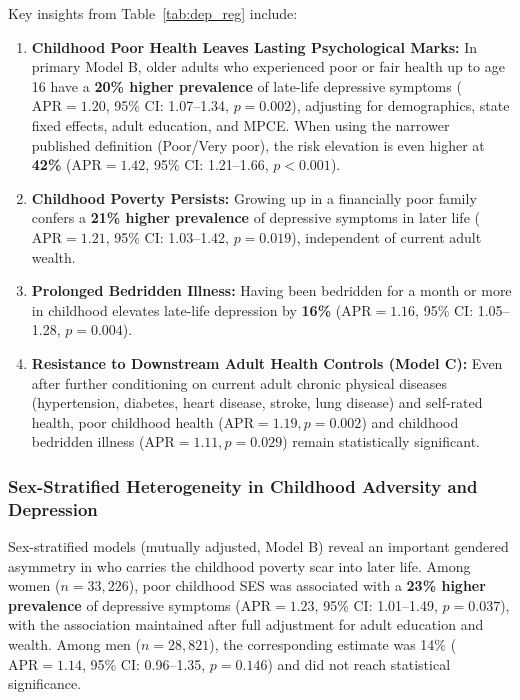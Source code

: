 Key insights from Table~\ref{tab:dep_reg} include:
\begin{enumerate}
    \item \textbf{Childhood Poor Health Leaves Lasting Psychological Marks:} In primary Model B, older adults who experienced poor or fair health up to age 16 have a \textbf{20\% higher prevalence} of late-life depressive symptoms ($\text{APR} = 1.20$, 95\% CI: 1.07--1.34, $p = 0.002$), adjusting for demographics, state fixed effects, adult education, and MPCE. When using the narrower published definition (Poor/Very poor), the risk elevation is even higher at \textbf{42\%} ($\text{APR} = 1.42$, 95\% CI: 1.21--1.66, $p < 0.001$).
    \item \textbf{Childhood Poverty Persists:} Growing up in a financially poor family confers a \textbf{21\% higher prevalence} of depressive symptoms in later life ($\text{APR} = 1.21$, 95\% CI: 1.03--1.42, $p = 0.019$), independent of current adult wealth.
    \item \textbf{Prolonged Bedridden Illness:} Having been bedridden for a month or more in childhood elevates late-life depression by \textbf{16\%} ($\text{APR} = 1.16$, 95\% CI: 1.05--1.28, $p = 0.004$).
    \item \textbf{Resistance to Downstream Adult Health Controls (Model C):} Even after further conditioning on current adult chronic physical diseases (hypertension, diabetes, heart disease, stroke, lung disease) and self-rated health, poor childhood health ($\text{APR} = 1.19, p = 0.002$) and childhood bedridden illness ($\text{APR} = 1.11, p = 0.029$) remain statistically significant.
\end{enumerate}

\subsubsection{Sex-Stratified Heterogeneity in Childhood Adversity and Depression}
Sex-stratified models (mutually adjusted, Model B) reveal an important gendered asymmetry in who carries the childhood poverty scar into later life. Among women ($n = 33{,}226$), poor childhood SES was associated with a \textbf{23\% higher prevalence} of depressive symptoms ($\text{APR} = 1.23$, 95\% CI: 1.01--1.49, $p = 0.037$), with the association maintained after full adjustment for adult education and wealth. Among men ($n = 28{,}821$), the corresponding estimate was 14\% ($\text{APR} = 1.14$, 95\% CI: 0.96--1.35, $p = 0.146$) and did not reach statistical significance.

